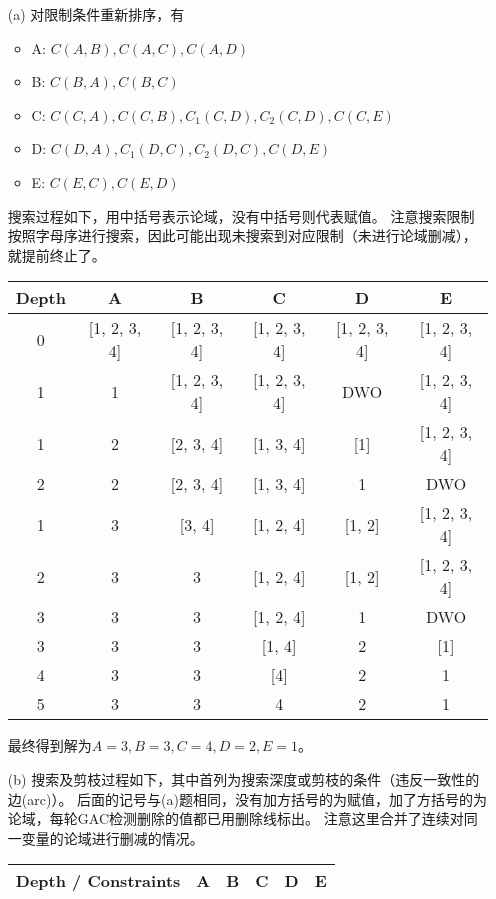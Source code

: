 \documentclass[a4paper, 11pt]{article}
\begin{document}
\begin{answer}
\begin{itemize}
\item [(a)] 对限制条件重新排序，有
\begin{itemize}
    \item A: $C(A,B),C(A,C),C(A,D)$
    \item B: $C(B,A),C(B,C)$
    \item C: $C(C,A),C(C,B),C_1(C,D),C_2(C,D),C(C,E)$
    \item D: $C(D,A),C_1(D,C),C_2(D,C),C(D,E)$
    \item E: $C(E,C),C(E,D)$
\end{itemize}
搜索过程如下，用中括号表示论域，没有中括号则代表赋值。
注意搜索限制按照字母序进行搜索，因此可能出现未搜索到对应限制（未进行论域删减），就提前终止了。
\begin{center}
\begin{tabular}{|c|c|c|c|c|c|}\hline
    Depth & A & B & C & D & E \\\hline
    0 & [1, 2, 3, 4] & [1, 2, 3, 4] & [1, 2, 3, 4] & [1, 2, 3, 4] & [1, 2, 3, 4]\\\hline
    1 & 1 & [1, 2, 3, 4] & [1, 2, 3, 4] & DWO & [1, 2, 3, 4]\\ \hline
    1 & 2 & [2, 3, 4] & [1, 3, 4] & [1] & [1, 2, 3, 4]\\ \hline
    2 & 2 & [2, 3, 4] & [1, 3, 4] & 1 & DWO\\ \hline
    1 & 3 & [3, 4] & [1, 2, 4] & [1, 2] & [1, 2, 3, 4]\\ \hline
    2 & 3 & 3 & [1, 2, 4] & [1, 2] & [1, 2, 3, 4]\\ \hline
    3 & 3 & 3 & [1, 2, 4] & 1 & DWO\\ \hline
    3 & 3 & 3 & [1, 4] & 2 & [1]\\ \hline
    4 & 3 & 3 & [4] & 2 & 1\\ \hline
    5 & 3 & 3 & 4 & 2 & 1\\ \hline
\end{tabular}
\end{center}
最终得到解为$A=3,B=3,C=4,D=2,E=1$。
\item [(b)]
搜索及剪枝过程如下，其中首列为搜索深度或剪枝的条件（违反一致性的边(arc)）。
后面的记号与(a)题相同，没有加方括号的为赋值，加了方括号的为论域，每轮GAC检测删除的值都已用删除线标出。
注意这里合并了连续对同一变量的论域进行删减的情况。
\begin{center}
\begin{longtable}{|c|c|c|c|c|c|}\hline
    Depth / Constraints & A & B & C & D & E\\\hline

\end{longtable}
\end{center}
\end{itemize}
\end{answer}
\end{document}

